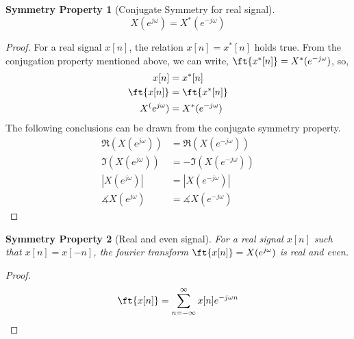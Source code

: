 \documentclass{home_assignment}
\newtheorem{subtheorem}{Symmetry Property}[theorem]
\begin{document}
{\begin{subtheorem}[Conjugate Symmetry for real signal]
                \begin{equation*}
                    X(e^{j\omega})=X^*(e^{-j\omega})
                \end{equation*}
                \end{subtheorem}
                \begin{proof}
                   For a real signal $x[n]$, the relation $x[n]=x^*[n]$ holds true. From the conjugation property mentioned above, we can write, $\ft{x^*[n]}=X^*(e^{-j\omega})$, so,
                   \begin{equation*}
                    \begin{aligned} 
                       x[n]&=x^*[n]\\
                       \ft{x[n]}&=\ft{x^*[n]}\\
                       X^(e^{j\omega})&=X^*(e^{-j\omega})
                    \end{aligned}
                    \end{equation*}
                    The following conclusions can be drawn from the conjugate symmetry property.
                    \begin{equation*}
                        \begin{aligned} 
                           \Re(X(e^{j\omega}))&=\Re(X(e^{-j\omega}))\\
                           \Im(X(e^{j\omega}))&=-\Im(X(e^{-j\omega}))\\
                           |X(e^{j\omega})|&=|X(e^{-j\omega})|\\
                           \measuredangle X(e^{j\omega})&=\measuredangle X(e^{-j\omega})
                        \end{aligned}
                        \end{equation*}
                \end{proof}
                \begin{subtheorem}[Real and even signal]
                For a real signal $x[n]$ such that $x[n]=x[-n]$,
                 the fourier transform $\ft{x[n]}=X(e^{j\omega})$ is real and even.
                    \end{subtheorem}
                    \begin{proof}
                       \begin{equation*}
                        \begin{aligned} 
                            \ft{x[n]}&=\sum_{n=-\infty}^{\infty} x[n] e^{-j\omega n}\\

\end{aligned}
\end{equation*}
\end{proof}}
\end{document}

